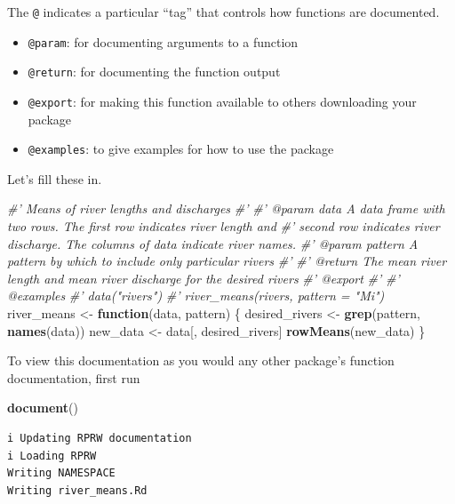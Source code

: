 \documentclass[
]{book}
\newenvironment{Shaded}{\begin{snugshade}}{\end{snugshade}}
\newcommand{\CommentTok}[1]{\textcolor[rgb]{0.56,0.35,0.01}{\textit{#1}}}
\newcommand{\ControlFlowTok}[1]{\textcolor[rgb]{0.13,0.29,0.53}{\textbf{#1}}}
\newcommand{\KeywordTok}[1]{\textcolor[rgb]{0.13,0.29,0.53}{\textbf{#1}}}
\newcommand{\NormalTok}[1]{#1}
\newcommand{\StringTok}[1]{\textcolor[rgb]{0.31,0.60,0.02}{#1}}
\providecommand{\tightlist}{%
  \setlength{\itemsep}{0pt}\setlength{\parskip}{0pt}}
\begin{document}
The \texttt{@} indicates a particular ``tag'' that controls how functions are documented.

\begin{itemize}
\tightlist
\item
  \texttt{@param}: for documenting arguments to a function
\item
  \texttt{@return}: for documenting the function output
\item
  \texttt{@export}: for making this function available to others downloading your package
\item
  \texttt{@examples}: to give examples for how to use the package
\end{itemize}

Let's fill these in.

\begin{Shaded}
\begin{Highlighting}[]
\CommentTok{#' Means of river lengths and discharges}
\CommentTok{#'}
\CommentTok{#' @param data A data frame with two rows. The first row indicates river length and}
\CommentTok{#'   second row indicates river discharge. The columns of data indicate river names.}
\CommentTok{#' @param pattern A pattern by which to include only particular rivers}
\CommentTok{#'}
\CommentTok{#' @return The mean river length and mean river discharge for the desired rivers}
\CommentTok{#' @export}
\CommentTok{#'}
\CommentTok{#' @examples}
\CommentTok{#' data("rivers")}
\CommentTok{#' river_means(rivers, pattern = "Mi")}
\NormalTok{river_means <-}\StringTok{ }\ControlFlowTok{function}\NormalTok{(data, pattern) \{}
\NormalTok{  desired_rivers <-}\StringTok{ }\KeywordTok{grep}\NormalTok{(pattern, }\KeywordTok{names}\NormalTok{(data))}
\NormalTok{  new_data <-}\StringTok{ }\NormalTok{data[, desired_rivers]}
  \KeywordTok{rowMeans}\NormalTok{(new_data)}
\NormalTok{\}}
\end{Highlighting}
\end{Shaded}

To view this documentation as you would any other package's function documentation, first run

\begin{Shaded}
\begin{Highlighting}[]
\KeywordTok{document}\NormalTok{()}
\end{Highlighting}
\end{Shaded}

\begin{verbatim}
i Updating RPRW documentation
i Loading RPRW
Writing NAMESPACE
Writing river_means.Rd
\end{verbatim}
\end{document}
